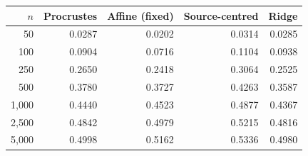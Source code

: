 \begin{tabular}{rrrrr}
\toprule
$n$ & Procrustes & Affine (fixed) & Source-centred & Ridge \\
\midrule
50 & 0.0287 & 0.0202 & 0.0314 & 0.0285 \\
100 & 0.0904 & 0.0716 & 0.1104 & 0.0938 \\
250 & 0.2650 & 0.2418 & 0.3064 & 0.2525 \\
500 & 0.3780 & 0.3727 & 0.4263 & 0.3587 \\
1,000 & 0.4440 & 0.4523 & 0.4877 & 0.4367 \\
2,500 & 0.4842 & 0.4979 & 0.5215 & 0.4816 \\
5,000 & 0.4998 & 0.5162 & 0.5336 & 0.4980 \\
\bottomrule
\end{tabular}